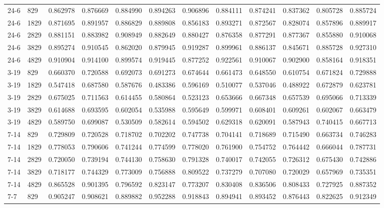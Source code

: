 \begin{longtable}{llrrrrrrrrrr}
24-6 & 829 & 0.862978 & 0.876669 & 0.884990 & 0.894263 & 0.906896 & 0.884111 & 0.874241 & 0.837362 & 0.805728 & 0.885724\\
24-6 & 1829 & 0.871695 & 0.891957 & 0.886829 & 0.889808 & 0.856183 & 0.893271 & 0.872567 & 0.828074 & 0.857896 & 0.889917\\
24-6 & 2829 & 0.881151 & 0.883982 & 0.908949 & 0.882649 & 0.880427 & 0.876358 & 0.877291 & 0.877367 & 0.855880 & 0.910068\\
24-6 & 3829 & 0.895274 & 0.910545 & 0.862020 & 0.879945 & 0.919287 & 0.899961 & 0.886137 & 0.845671 & 0.885728 & 0.927310\\
24-6 & 4829 & 0.910904 & 0.914100 & 0.899574 & 0.919445 & 0.877252 & 0.922561 & 0.910067 & 0.902900 & 0.858164 & 0.918351\\
3-19 & 829 & 0.660370 & 0.720588 & 0.692073 & 0.691273 & 0.674644 & 0.661473 & 0.648550 & 0.610754 & 0.671824 & 0.729888\\
3-19 & 1829 & 0.547418 & 0.687580 & 0.587676 & 0.483386 & 0.596169 & 0.510077 & 0.537046 & 0.488922 & 0.672879 & 0.623781\\
3-19 & 2829 & 0.675025 & 0.711563 & 0.614455 & 0.580864 & 0.523123 & 0.653666 & 0.667348 & 0.657539 & 0.695066 & 0.713339\\
3-19 & 3829 & 0.614688 & 0.693595 & 0.602054 & 0.535988 & 0.595649 & 0.599971 & 0.608401 & 0.609261 & 0.602067 & 0.663479\\
3-19 & 4829 & 0.589750 & 0.699087 & 0.530509 & 0.582614 & 0.594502 & 0.629318 & 0.620091 & 0.587943 & 0.740415 & 0.667713\\
7-14 & 829 & 0.729809 & 0.720528 & 0.718702 & 0.702202 & 0.747738 & 0.704141 & 0.718689 & 0.715490 & 0.663734 & 0.746283\\
7-14 & 1829 & 0.778053 & 0.790606 & 0.741244 & 0.774599 & 0.778020 & 0.761900 & 0.754752 & 0.764442 & 0.666044 & 0.787731\\
7-14 & 2829 & 0.720050 & 0.739194 & 0.744130 & 0.758630 & 0.791328 & 0.740017 & 0.742055 & 0.726312 & 0.675430 & 0.742886\\
7-14 & 3829 & 0.718177 & 0.744329 & 0.773009 & 0.756888 & 0.809522 & 0.737279 & 0.707080 & 0.720029 & 0.657969 & 0.735351\\
7-14 & 4829 & 0.865528 & 0.901395 & 0.796592 & 0.823147 & 0.773207 & 0.830408 & 0.836506 & 0.808433 & 0.727925 & 0.887352\\
7-7 & 829 & 0.905247 & 0.908621 & 0.889882 & 0.952288 & 0.918843 & 0.894941 & 0.893452 & 0.876443 & 0.822625 & 0.912349\\

\end{longtable}
